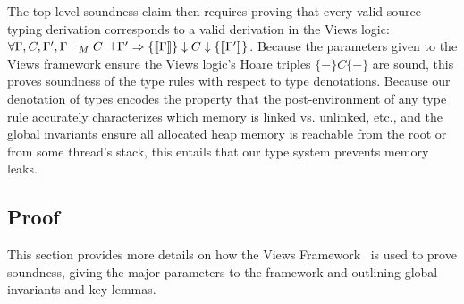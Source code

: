 The top-level soundness claim then requires proving that every valid source typing derivation corresponds to a valid derivation in the Views logic:
$
    \forall \Gamma,C,\Gamma', \Gamma\vdash_M C \dashv \Gamma' \Rightarrow \{\llbracket\Gamma\rrbracket\}\downarrow C\downarrow\{\llbracket\Gamma'\rrbracket\}
$.
Because the parameters given to the Views framework ensure the Views logic's Hoare triples $\{-\}C\{-\}$ are sound, this proves soundness of the type rules with respect to type denotations.
Because our denotation of types encodes the property that the post-environment of any type rule accurately characterizes which memory is linked vs. unlinked, etc., and the global invariants ensure all allocated heap memory is reachable from the root or from some thread's stack, this entails that our type system prevents memory leaks.
\subsection{Proof}
\label{sec:proof}
This section provides more details on how the Views Framework~\cite{views} is used to prove soundness, giving the major parameters to the framework and outlining global invariants and key lemmas.

